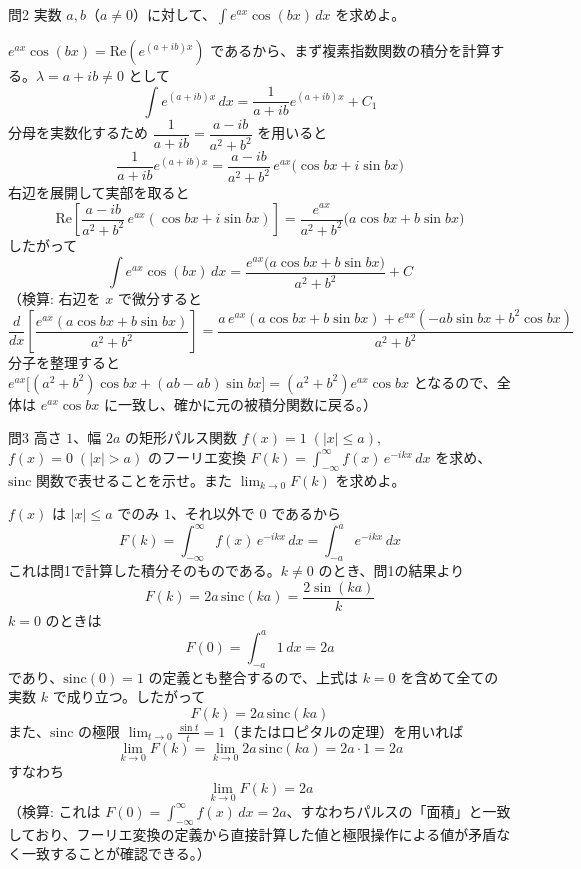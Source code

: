 \documentclass[a4paper,11pt]{article}
\begin{document}
\clearpage
\begin{mondaiboxS}{問2}
実数 $a, b$（$a \neq 0$）に対して、$\displaystyle\int e^{ax}\cos(bx)\,dx$ を求めよ。
\end{mondaiboxS}
\kaitou
$e^{ax}\cos(bx) = \mathrm{Re}\left(e^{(a+ib)x}\right)$ であるから、まず複素指数関数の積分を計算する。$\lambda = a+ib \neq 0$ として
\[
\int e^{(a+ib)x}\,dx = \frac{1}{a+ib}e^{(a+ib)x} + C_{1}
\]
分母を実数化するため $\dfrac{1}{a+ib} = \dfrac{a-ib}{a^{2}+b^{2}}$ を用いると
\[
\frac{1}{a+ib}e^{(a+ib)x}
= \frac{a-ib}{a^{2}+b^{2}}\,e^{ax}\bigl(\cos bx + i\sin bx\bigr)
\]
右辺を展開して実部を取ると
\[
\mathrm{Re}\left[\frac{a-ib}{a^{2}+b^{2}}\,e^{ax}(\cos bx + i\sin bx)\right]
= \frac{e^{ax}}{a^{2}+b^{2}}\bigl(a\cos bx + b\sin bx\bigr)
\]
したがって
\[
\boxed{\; \int e^{ax}\cos(bx)\,dx = \frac{e^{ax}\bigl(a\cos bx + b\sin bx\bigr)}{a^{2}+b^{2}} + C \;}
\]
（検算: 右辺を $x$ で微分すると
\[
\frac{d}{dx}\left[\frac{e^{ax}(a\cos bx + b\sin bx)}{a^{2}+b^{2}}\right]
= \frac{a\,e^{ax}(a\cos bx + b\sin bx) + e^{ax}(-ab\sin bx + b^{2}\cos bx)}{a^{2}+b^{2}}
\]
分子を整理すると $e^{ax}\bigl[(a^{2}+b^{2})\cos bx + (ab - ab)\sin bx\bigr] = (a^{2}+b^{2})e^{ax}\cos bx$ となるので、全体は $e^{ax}\cos bx$ に一致し、確かに元の被積分関数に戻る。）

\clearpage
\begin{mondaiboxS}{問3}
高さ $1$、幅 $2a$ の矩形パルス関数 $f(x) = 1\;(|x|\le a)$, $f(x) = 0\;(|x|>a)$ のフーリエ変換 $F(k) = \displaystyle\int_{-\infty}^{\infty} f(x)\,e^{-ikx}\,dx$ を求め、$\mathrm{sinc}$ 関数で表せることを示せ。また $\displaystyle\lim_{k \to 0} F(k)$ を求めよ。
\end{mondaiboxS}
\kaitou
$f(x)$ は $|x|\le a$ でのみ $1$、それ以外で $0$ であるから
\[
F(k) = \int_{-\infty}^{\infty} f(x)\,e^{-ikx}\,dx = \int_{-a}^{a} e^{-ikx}\,dx
\]
これは問1で計算した積分そのものである。$k \neq 0$ のとき、問1の結果より
\[
F(k) = 2a\,\mathrm{sinc}(ka) = \frac{2\sin(ka)}{k}
\]
$k=0$ のときは
\[
F(0) = \int_{-a}^{a} 1\,dx = 2a
\]
であり、$\mathrm{sinc}(0)=1$ の定義とも整合するので、上式は $k=0$ を含めて全ての実数 $k$ で成り立つ。したがって
\[
\boxed{\; F(k) = 2a\,\mathrm{sinc}(ka) \;}
\]
また、$\mathrm{sinc}$ の極限 $\displaystyle\lim_{t\to 0}\frac{\sin t}{t} = 1$（またはロピタルの定理）を用いれば
\[
\lim_{k\to 0} F(k) = \lim_{k\to 0} 2a\,\mathrm{sinc}(ka) = 2a\cdot 1 = 2a
\]
すなわち
\[
\boxed{\; \lim_{k\to 0} F(k) = 2a \;}
\]
（検算: これは $F(0) = \int_{-\infty}^{\infty} f(x)\,dx = 2a$、すなわちパルスの「面積」と一致しており、フーリエ変換の定義から直接計算した値と極限操作による値が矛盾なく一致することが確認できる。）
\end{document}
